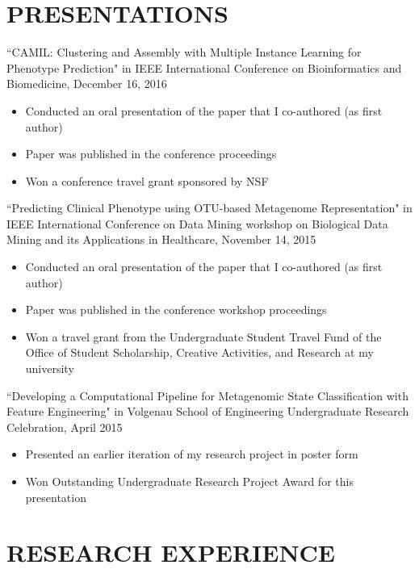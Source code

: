 \documentclass[margin, 10pt]{res} %
\begin{document}
\begin{resume}
\section{PRESENTATIONS}
``CAMIL: Clustering and Assembly with Multiple Instance Learning for Phenotype Prediction" in IEEE International Conference on Bioinformatics and Biomedicine, December 16, 2016
\begin{itemize} \itemsep -2pt %
\item Conducted an oral presentation of the paper that I co-authored (as first author)
\item Paper was published in the conference proceedings
\item Won a conference travel grant sponsored by NSF
\end{itemize}

``Predicting Clinical Phenotype using OTU-based Metagenome Representation" in IEEE International Conference on Data Mining workshop on Biological Data Mining and its Applications in Healthcare, November 14, 2015
\begin{itemize} \itemsep -2pt %
\item Conducted an oral presentation of the paper that I co-authored (as first author)
\item Paper was published in the conference workshop proceedings
\item Won a travel grant from the Undergraduate Student Travel Fund of the Office of Student Scholarship, Creative Activities, and Research at my university
\end{itemize}

``Developing a Computational Pipeline for Metagenomic State Classification with Feature Engineering" in Volgenau School of Engineering Undergraduate Research Celebration, April 2015
\begin{itemize} \itemsep -2pt %
\item Presented an earlier iteration of my research project in poster form
\item Won Outstanding Undergraduate Research Project Award for this presentation
\end{itemize}


\section{RESEARCH EXPERIENCE}


\end{resume}
\end{document}
